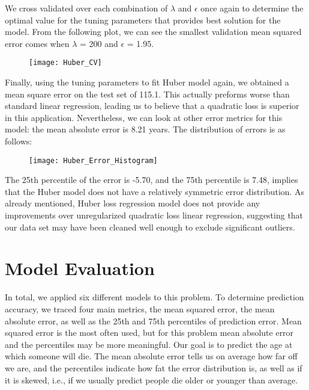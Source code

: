 \documentclass[letterpaper, 10 pt, conference]{ieeeconf}  %
\begin{document}
We cross validated over each combination of $\lambda$ and $\epsilon$ once again to determine the optimal value for the tuning parameters that provides best solution for the model. From the following plot, we can see the smallest validation mean squared error comes when $\lambda$ = 200 and $\epsilon$ = 1.95. 
\begin{figure}[ht]
\label{Huber CV Error Plot}
\begin{center}
\texttt{[image: Huber\_CV]}
\end{center}
\end{figure}

Finally, using the tuning parameters to fit Huber model again, we obtained a mean square error on the test set of 115.1. This actually preforms worse than standard linear regression, leading us to believe that a quadratic loss is superior in this application. Nevertheless, we can look at other error metrics for this model: the mean absolute error is 8.21 years. The distribution of errors is as follows:

\begin{figure}[ht]
\label{Huber Error Plot}
\begin{center}
\texttt{[image: Huber\_Error\_Histogram]}
\end{center}
\end{figure}

The 25th percentile of the error is -5.70, and the 75th percentile is 7.48, implies that the Huber model does not have a relatively symmetric error distribution. As already mentioned, Huber loss regression model does not provide any improvements over unregularized quadratic loss linear regression, suggesting that our data set may have been cleaned well enough to exclude significant outliers.




\section{Model Evaluation}
In total, we applied six different models to this problem. To determine prediction accuracy, we traced four main metrics, the mean squared error, the mean absolute error, as well as the 25th and 75th percentiles of prediction error. Mean squared error is the most often used, but for this problem mean absolute error and the percentiles may be more meaningful. Our goal is to predict the age at which someone will die. The mean absolute error tells us on average how far off we are, and the percentiles indicate how fat the error distribution is, as well as if it is skewed, i.e., if we usually predict people die older or younger than average. 
\end{document}

